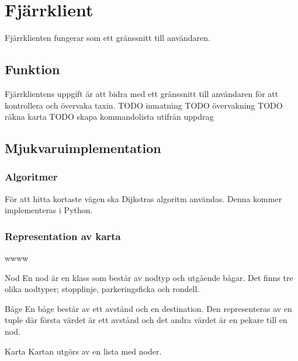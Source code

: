 \documentclass[designspec/spec.tex]{subfiles}
\begin{document}
\section{Fjärrklient}
Fjärrklienten fungerar som ett gränssnitt till användaren.

\subsection{Funktion}
Fjärrklientens uppgift är att bidra med ett gränssnitt till användaren för att
kontrollera och övervaka taxin.
TODO inmatning
TODO övervakning
TODO räkna karta
TODO skapa kommandolista utifrån uppdrag

\subsection{Mjukvaruimplementation}

\subsubsection{Algoritmer}
För att hitta kortaste vägen ska Dijkstras algoritm användas. Denna kommer
implementeras i Python.

\subsubsection{Representation av karta}

\begin{labeling}{wwww}
    \item[Nod] En nod är en klass som består av nodtyp och utgående bågar. Det
    finns tre olika nodtyper; stopplinje, parkeringsficka och rondell.

    \item[Båge] En båge består av ett avstånd och en destination. Den
    representeras av en tuple där första värdet är ett avstånd och det andra
    värdet är en pekare till en nod.

    \item[Karta] Kartan utgörs av en lista med noder.
\end{labeling}
\end{document}

